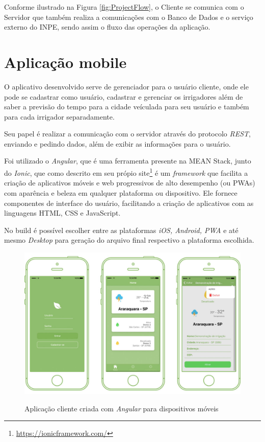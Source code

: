 \documentclass[
	12pt,				%
	openright,			%
	twoside,			%
	a4paper,			%
	english,			%
	brazil				%
	]{abntex2}
\begin{document}
Conforme ilustrado na Figura \ref{fig:ProjectFlow}, o Cliente se comunica com o Servidor que também realiza a comunicações com o Banco de Dados e o serviço externo do INPE, sendo assim o fluxo das operações da aplicação.

\section{Aplicação mobile}

O aplicativo desenvolvido serve de gerenciador para o usuário cliente, onde ele pode se cadastrar como usuário, cadastrar e gerenciar os irrigadores além de saber a previsão do tempo para a cidade veículada para seu usuário e também para cada irrigador separadamente.

Seu papel é realizar a comunicação com o servidor através do protocolo \textit{REST}, enviando e pedindo dados, além de exibir as informações para o usuário.

Foi utilizado o \textit{Angular}, que é uma ferramenta presente na MEAN Stack, junto do \textit{Ionic}, que como descrito em seu própio site\footnote{\url{https://ionicframework.com/}} é um \textit{framework} que facilita a criação de aplicativos móveis e web progressivos de alto desempenho (ou PWAs) com aparência e beleza em qualquer plataforma ou dispositivo. Ele fornece componentes de interface do usuário, facilitando a criação de aplicativos com as linguagens HTML, CSS e JavaScript.

No build é possível escolher entre as plataformas \textit{iOS, Android, PWA} e até mesmo \textit{Desktop} para geração do arquivo final respectivo a plataforma escolhida.

\begin{figure}[h]
	\centering

	\caption{Aplicação cliente criada com \textit{Angular} para dispositivos móveis} \label{fig:ClientAppExample}
    \includegraphics[scale=0.4]{client-app} \\

\end{figure}
\end{document}
